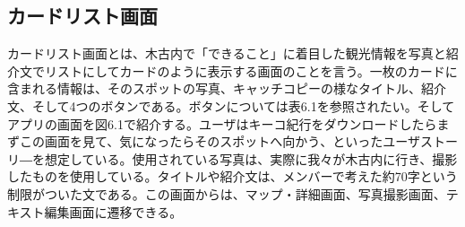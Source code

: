 \subsection{カードリスト画面}
カードリスト画面とは、木古内で「できること」に着目した観光情報を写真と紹介文でリストにしてカードのように表示する画面のことを言う。一枚のカードに含まれる情報は、そのスポットの写真、キャッチコピーの様なタイトル、紹介文、そして4つのボタンである。ボタンについては表6.1を参照されたい。そしてアプリの画面を図6.1で紹介する。ユーザはキーコ紀行をダウンロードしたらまずこの画面を見て、気になったらそのスポットへ向かう、といったユーザストーリ―を想定している。使用されている写真は、実際に我々が木古内に行き、撮影したものを使用している。タイトルや紹介文は、メンバーで考えた約70字という制限がついた文である。この画面からは、マップ・詳細画面、写真撮影画面、テキスト編集画面に遷移できる。

